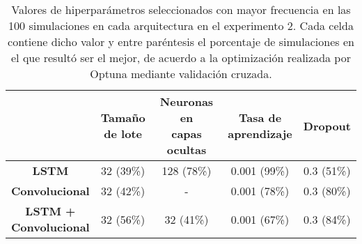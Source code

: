 \documentclass[../../main.tex]{subfiles}
\begin{document}
\begin{table}[ht]
    \centering
    \renewcommand{\arraystretch}{1.2}
    \begin{tabular}{|c|c|c|c|c|}
        \hline
            & \makecell{\textbf{Tamaño}\\\textbf{de lote}}
            & \makecell{\textbf{Neuronas en}\\\textbf{capas ocultas}}
            & \makecell{\textbf{Tasa de}\\\textbf{aprendizaje}}
            & \textbf{Dropout} \\ \hline\hline
        \textbf{LSTM}
            & 32 (39\%) & 128 (78\%) & 0.001 (99\%) & 0.3 (51\%) \\ \hline
        \textbf{Convolucional}
            & 32 (42\%) & -          & 0.001 (78\%) & 0.3 (80\%) \\ \hline
        \makecell{\textbf{LSTM +}\\\textbf{Convolucional}}
            & 32 (56\%) & 32 (41\%)  & 0.001 (67\%) & 0.3 (84\%) \\
        \hline
    \end{tabular}
    \caption{Valores de hiperparámetros seleccionados con mayor frecuencia en las 100
    simulaciones en cada arquitectura en el experimento 2. Cada celda contiene dicho valor
    y entre paréntesis el porcentaje de simulaciones en el que resultó ser el mejor, de
    acuerdo a la optimización realizada por Optuna mediante validación cruzada.}
    \label{tab:hyperparams_exp2}
\end{table}
\end{document}
